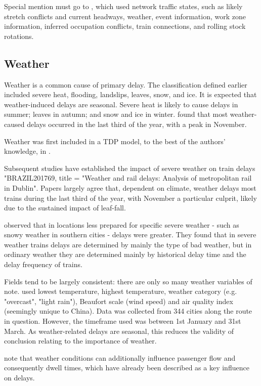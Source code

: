 \documentclass{article}
\begin{document}
Special mention must go to \cite{nair_et_al_2019}, which used network traffic states, such as likely stretch conflicts and current headways, weather, event information, work zone information, inferred occupation conflicts, train connections, and rolling stock rotations.

\subsection{Weather}

Weather is a common cause of primary delay. The classification defined earlier included severe heat, flooding, landslips, leaves, snow, and ice. It is expected that weather-induced delays are seasonal. Severe heat is likely to cause delays in summer; leaves in autumn; and snow and ice in winter. \cite{brazil_2017} found that most weather-caused delays occurred in the last third of the year, with a peak in November. 

Weather was first included in a TDP model, to the best of the authors' knowledge, in \cite{oneto_et_al_2016}.

Subsequent studies have established the impact of severe weather on train delays "BRAZIL201769, title = "Weather and rail delays: Analysis of metropolitan rail in Dublin".
Papers largely agree that, dependent on climate, weather delays most trains during the last third of the year, with November a particular culprit, likely due to the sustained impact of leaf-fall.

\cite{wang_et_al_2019} observed that in locations less prepared for specific severe weather - such as snowy weather in southern cities - delays were greater. They found that in severe weather trains delays are determined by mainly the type of bad weather, but in ordinary weather they are determined mainly by historical delay time and the delay frequency of trains. 

Fields tend to be largely consistent: there are only so many weather variables of note. \cite{wang_et_al_2019} used lowest temperature, highest temperature, weather category (e.g. "overcast", "light rain"), Beaufort scale (wind speed) and air quality index (seemingly unique to China). Data was collected from 344 cities along the route in question. However, the timeframe used was between 1st January and 31st March. As weather-related delays are seasonal, this reduces the validity of conclusion relating to the importance of weather. 

\cite{oneto_et_al_2016} note that weather conditions can additionally influence passenger flow and consequently dwell times, which have already been described as a key influence on delays. 
\end{document}
